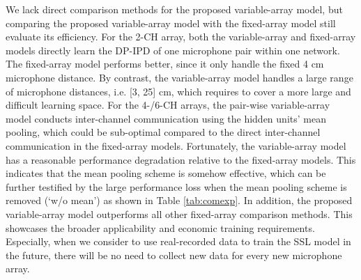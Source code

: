 \documentclass[lettersize,journal]{IEEEtran}
\begin{document}
We lack direct comparison methods for the proposed variable-array model, but comparing the proposed variable-array model with the fixed-array model still evaluate its efficiency. For the 2-CH array, both the variable-array and fixed-array models directly learn the DP-IPD of one microphone pair within one network. The fixed-array model performs better, since it only handle the fixed 4 cm microphone distance. By contrast, the variable-array model handles a large range of microphone distances, i.e. [3, 25] cm, which requires to cover a more large and difficult learning space. 
For the 4-/6-CH arrays, the pair-wise variable-array model conducts inter-channel communication using the hidden units' mean pooling, which could be sub-optimal compared to the direct inter-channel communication in the fixed-array models. Fortunately, the variable-array model has a reasonable performance degradation relative to the fixed-array models. This indicates that the mean pooling scheme is somehow effective, which can be further testified by the large performance loss when the mean pooling scheme is removed (`w/o mean') as shown in Table \ref{tab:comexp}. In addition, the proposed variable-array model outperforms all other fixed-array comparison methods. This showcases the broader applicability and economic training requirements. Especially, when we consider to use real-recorded data to train the SSL model in the future, there will be no need to collect new data for every new microphone array.  

\end{document}
